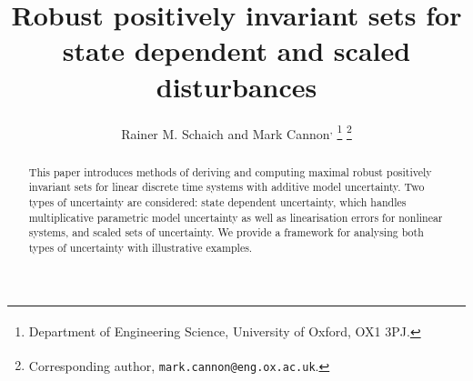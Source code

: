\documentclass[letterpaper, 10pt, conference]{ieeeconf} %
\begin{document}
  \title{Robust positively invariant sets for state dependent and scaled disturbances}

\author{Rainer M. Schaich\textsuperscript{\dag} %
         and Mark Cannon\textsuperscript{\dag,\ddag}%
\thanks{\textsuperscript{\dag} Department of Engineering Science, University of Oxford, OX1 3PJ.}%
\thanks{\textsuperscript{\ddag} Corresponding author, 
        \texttt{mark.cannon@eng.ox.ac.uk}.}
}
\newcommand{\note}[1]{\todo[inline]{#1}}

\maketitle

\begin{abstract} 
  This paper introduces methods of deriving and computing maximal robust positively invariant sets 
  for linear discrete time systems with additive model uncertainty. Two types of uncertainty are 
  considered: state dependent uncertainty, which handles multiplicative parametric model uncertainty 
  as well as linearisation errors for nonlinear systems, and scaled sets of uncertainty. We provide 
  a framework for analysing both types of uncertainty with illustrative examples.
\end{abstract}

\begin{keywords}
\vskip-\baselineskip
\end{keywords}
\end{document}
